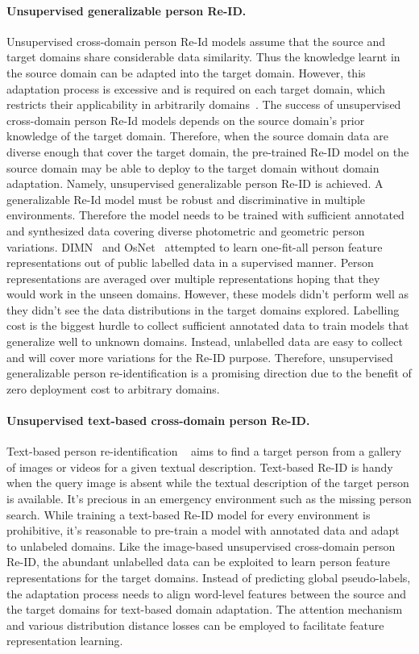 \documentclass[a4paper,fleqn]{cas-dc}
\begin{document}
\paragraph{Unsupervised generalizable person Re-ID.}
Unsupervised cross-domain person Re-Id models assume that the source and target domains share considerable data similarity. Thus the knowledge learnt in the source domain can be adapted into the target domain. However, this adaptation process is excessive and is required on each target domain, which restricts their applicability in arbitrarily domains~\cite{ferrari_unsupervised_2018}. The success of unsupervised cross-domain person Re-Id models depends on the source domain's prior knowledge of the target domain. Therefore, when the source domain data are diverse enough that cover the target domain, the pre-trained Re-ID model on the source domain may be able to deploy to the target domain without domain adaptation. Namely, unsupervised generalizable person Re-ID is achieved. A generalizable Re-Id model must be robust and discriminative in multiple environments. Therefore the model needs to be trained with sufficient annotated and synthesized data covering diverse photometric and geometric person variations.  DIMN~\cite{song_generalizable_2019} and OsNet~\cite{zhou_omni-scale_2019} attempted to learn one-fit-all person feature representations out of public labelled data in a supervised manner. Person representations are averaged over multiple representations hoping that they would work in the unseen domains. However, these models didn't perform well as they didn't see the data distributions in the target domains explored. Labelling cost is the biggest hurdle to collect sufficient annotated data to train models that generalize well to unknown domains. Instead, unlabelled data are easy to collect and will cover more variations for the Re-ID purpose. Therefore, unsupervised generalizable person re-identification is a promising direction due to the benefit of zero deployment cost to arbitrary domains.

\paragraph{Unsupervised text-based cross-domain person Re-ID.}
Text-based person re-identification ~\cite{li_person_2017b} aims to find a target person from a gallery of images or videos for a given textual description. Text-based Re-ID is handy when the query image is absent while the textual description of the target person is available. It's precious in an emergency environment such as the missing person search. While training a text-based Re-ID model for every environment is prohibitive, it's reasonable to pre-train a model with annotated data and adapt to unlabeled domains. Like the image-based unsupervised cross-domain person Re-ID, the abundant unlabelled data can be exploited to learn person feature representations for the target domains. Instead of predicting global pseudo-labels, the adaptation process needs to align word-level features between the source and the target domains for text-based domain adaptation. The attention mechanism and various distribution distance losses can be employed to facilitate feature representation learning.
\end{document}
